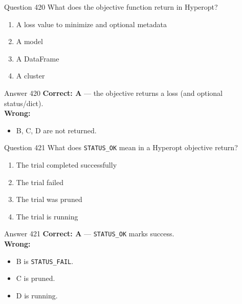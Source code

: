 \documentclass[aspectratio=169,11pt]{beamer}
\begin{document}
	\begin{frame}{Question 420}
		What does the objective function return in Hyperopt?
		\begin{enumerate}[label=\Alph*.]
			\item A loss value to minimize and optional metadata
			\item A model
			\item A DataFrame
			\item A cluster
		\end{enumerate}
	\end{frame}
	\begin{frame}{Answer 420}
		\textbf{Correct: A} --- the objective returns a loss (and optional status/dict).\\
		\vspace{0.5em}
		\textbf{Wrong:}
		\begin{itemize}
			\item B, C, D are not returned.
		\end{itemize}
	\end{frame}
	
	\begin{frame}{Question 421}
		What does \texttt{STATUS\_OK} mean in a Hyperopt objective return?
		\begin{enumerate}[label=\Alph*.]
			\item The trial completed successfully
			\item The trial failed
			\item The trial was pruned
			\item The trial is running
		\end{enumerate}
	\end{frame}
	\begin{frame}{Answer 421}
		\textbf{Correct: A} --- \texttt{STATUS\_OK} marks success.\\
		\vspace{0.5em}
		\textbf{Wrong:}
		\begin{itemize}
			\item B is \texttt{STATUS\_FAIL}.
			\item C is pruned.
			\item D is running.
		\end{itemize}
	\end{frame}
	
\end{document}
